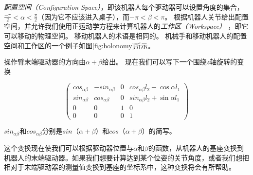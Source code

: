 \emph{配置空间（Configuration Space）}，即该机器人每个驱动器可以设置角度的集合，$\frac{-\pi}{2} <\alpha <\frac{\pi}{2}$（因为它不应该进入桌子），而$-\pi <\beta <\pi$。 根据机器人关节给出配置空间，并允许我们使用正运动学方程来计算机器人的\emph{工作区（Workspace）} ，即它可以移动的物理空间。 移动机器人的术语是相同的。 机械手和移动机器人的配置空间和工作区的一个例子如图\ref{fig:holonomy}所示。


操作臂末端驱动器的方向由$\alpha+\beta$给出。 现在我们可以写下一个围绕$z$轴旋转的变换

\begin{equation}
\label{eq:2armtrans}
\left(\begin{array}{llll}cos_{\alpha\beta} & -sin_{\alpha\beta} &  0 & cos_{\alpha\beta}l_2+\cos\alpha l_1\\
                        sin_{\alpha\beta} & cos_{\alpha\beta} & 0 & sin_{\alpha\beta}l_2+\sin\alpha l_1\\
												0 & 0 & 1 & 0\\
												0 & 0 & 0 & 1\end{array}\right)
\end{equation}


$sin_{\alpha \beta}$和$cos_{\alpha \beta}$分别是$sin（\alpha+\beta）$和$cos（\alpha+\beta）$的简写。


这个变换现在使我们可以根据驱动器位置与$\alpha$和$\beta$的函数，从机器人的基座变换到机器人的末端驱动器。如果我们想要计算达到某个位姿的关节角度，或者我们想把相对于末端驱动器的测量值变换到基座的坐标系中，这种变换将会有所帮助。

